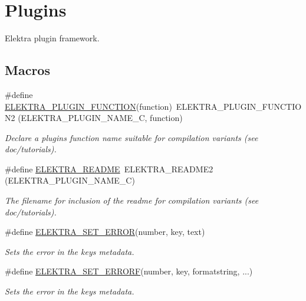 \hypertarget{group__plugin}{}\section{Plugins}
\label{group__plugin}


Elektra plugin framework.  


\subsection*{Macros}
\begin{DoxyCompactItemize}
\item 
\#define \mbox{\hyperlink{group__plugin_gacb05c902e4014535589db4193da87460}{E\+L\+E\+K\+T\+R\+A\+\_\+\+P\+L\+U\+G\+I\+N\+\_\+\+F\+U\+N\+C\+T\+I\+ON}}(function)~E\+L\+E\+K\+T\+R\+A\+\_\+\+P\+L\+U\+G\+I\+N\+\_\+\+F\+U\+N\+C\+T\+I\+O\+N2 (E\+L\+E\+K\+T\+R\+A\+\_\+\+P\+L\+U\+G\+I\+N\+\_\+\+N\+A\+M\+E\+\_\+C, function)
\begin{DoxyCompactList}\small\item\em Declare a plugin\textquotesingle{}s function name suitable for compilation variants (see doc/tutorials). \end{DoxyCompactList}\item 
\#define \mbox{\hyperlink{group__plugin_gabdcb97b05a83130c32bbde75db80fc50}{E\+L\+E\+K\+T\+R\+A\+\_\+\+R\+E\+A\+D\+ME}}~E\+L\+E\+K\+T\+R\+A\+\_\+\+R\+E\+A\+D\+M\+E2 (E\+L\+E\+K\+T\+R\+A\+\_\+\+P\+L\+U\+G\+I\+N\+\_\+\+N\+A\+M\+E\+\_\+C)
\begin{DoxyCompactList}\small\item\em The filename for inclusion of the readme for compilation variants (see doc/tutorials). \end{DoxyCompactList}\item 
\#define \mbox{\hyperlink{group__plugin_gaab1842b82272e6d4235b6a71587a64d9}{E\+L\+E\+K\+T\+R\+A\+\_\+\+S\+E\+T\+\_\+\+E\+R\+R\+OR}}(number,  key,  text)
\begin{DoxyCompactList}\small\item\em Sets the error in the keys metadata. \end{DoxyCompactList}\item 
\#define \mbox{\hyperlink{group__plugin_ga3e4fc2c20d8e64bed7a54bb1af882e34}{E\+L\+E\+K\+T\+R\+A\+\_\+\+S\+E\+T\+\_\+\+E\+R\+R\+O\+RF}}(number,  key,  formatstring, ...)
\begin{DoxyCompactList}\small\item\em Sets the error in the keys metadata. \end{DoxyCompactList}\item 

\end{DoxyCompactItemize}
